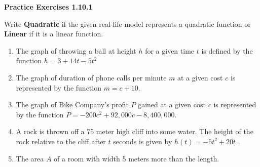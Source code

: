 \vspace{1ex}
\noindent\textbf{Practice Exercises 1.10.1}

\vspace{0.75ex}

Write \textbf{Quadratic} if the
 given real-life model represents a quadratic function or \textbf{Linear} if it is a linear function. 

\begin{enumerate}[label = \color{blue}\arabic*. ]
\item The graph of throwing a ball at height $h$ for a 
given time $t$ is defined by the function $h = 3 + 14t - 5t^{2}$ 
\item The graph of duration of phone calls per minute $m$ at a given cost $c$ is represented by the function $m = c + 10$. 
\item The graph of Bike Company's profit $P$ gained at a given cost $c$ is represented by the function $P = -200c^{2} + 92,000c - 8,400,000$. 
\item A rock is thrown off a 75 meter high cliff into some water. The height of the 
rock relative to the cliff after $t$ seconds is given by $h(t)=-5t^{2}+20t$ .
\item The area $A$ of a room with width 5 meters more than the length.
\end{enumerate}







